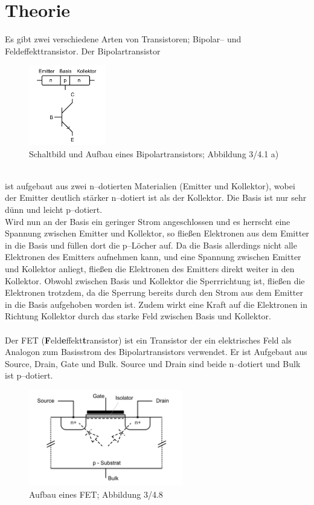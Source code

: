 \documentclass[a4paper,10pt]{article}
\numberwithin{equation}{section}
\begin{document}
\section{Theorie}
Es gibt zwei verschiedene Arten von Transistoren; Bipolar-- und Feldeffekttransistor.
Der Bipolartransistor
\begin{figure}[h]
        \centering
        \includegraphics[width=0.3\textwidth]{bipolartransistor.png}
        \caption{Schaltbild und Aufbau eines Bipolartransistors; Abbildung 3/4.1 a) \cite{Praktikumsanleitung}}
\end{figure}\\
ist aufgebaut aus zwei n--dotierten Materialien (Emitter und Kollektor), wobei der Emitter deutlich stärker n--dotiert ist als der Kollektor.
Die Basis ist nur sehr dünn und leicht p--dotiert.
\\\indent Wird nun an der Basis ein geringer Strom angeschlossen und es herrscht eine Spannung zwischen Emitter und Kollektor, so fließen Elektronen aus dem Emitter in die Basis und füllen dort die p--Löcher auf.
Da die Basis allerdings nicht alle Elektronen des Emitters aufnehmen kann, und eine Spannung zwischen Emitter und Kollektor anliegt, fließen die Elektronen des Emitters direkt weiter in den Kollektor.
Obwohl zwischen Basis und Kollektor die Sperrrichtung ist, fließen die Elektronen trotzdem, da die Sperrung bereits durch den Strom aus dem Emitter in die Basis aufgehoben worden ist.
Zudem wirkt eine Kraft auf die Elektronen in Richtung Kollektor durch das starke Feld zwischen Basis und Kollektor.
\\\\ Der FET (\textbf{F}eld\textbf{e}ffekt\textbf{t}ransistor) ist ein Transistor der ein elektrisches Feld als Analogon zum Basisstrom des Bipolartransistors verwendet.
Er ist Aufgebaut aus Source, Drain, Gate und Bulk.
Source und Drain sind beide n--dotiert und Bulk ist p--dotiert.
\begin{figure}[h]
        \centering
        \includegraphics[width=0.6\textwidth]{fet.png}
        \caption{Aufbau eines FET; Abbildung 3/4.8 \cite{Praktikumsanleitung}}
\end{figure}\\
\end{document}
